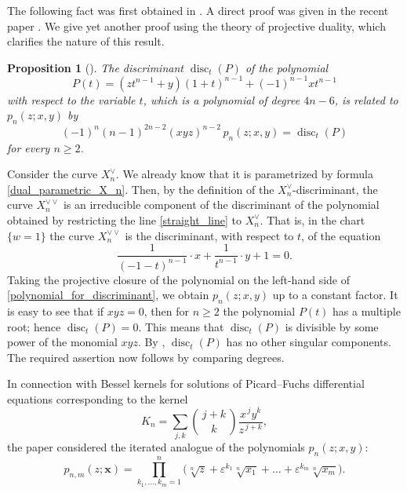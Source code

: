 \documentclass[14pt, dvipsnames]{extarticle}
\makeatletter
\theoremstyle{plain}
\newtheorem{prop}{Proposition}
\theoremstyle{definition}
\theoremstyle{remark}
\renewenvironment{proof}[1][\proofname]{
  \par\pushQED{\qed}\normalfont
  \topsep6\p@\@plus6\p@\relax
  \trivlist\item[\hskip\labelsep\bfseries\itshape #1\@addpunct{.}]
}{\popQED\endtrivlist\@endpefalse}
\DeclareMathOperator{\disc}{\mathrm{disc}}
\makeatother
\begin{document}

The following fact was first obtained in \cite[Theorem 2.3]{Gaiur}. A direct proof was given in the recent paper \cite{BK}. We give yet another proof using the theory of projective duality, which clarifies the nature of this result.

\begin{prop}[\cite{Gaiur}]
The discriminant $\disc_t(P)$ of the polynomial
$$P(t)=(z t^{n-1}+y)(1+t)^{n-1}+(-1)^{n-1}x t^{n-1}$$
with respect to the variable $t$, which is a polynomial of degree $4n-6$, is related to $p_n(z;x,y)$ by
$$(-1)^n (n-1)^{2n-2} (xyz)^{n-2}\, p_n(z;x,y)=\disc_t(P)$$
for every $n\ge 2$.
\end{prop}

\begin{proof}
Consider the curve $X_n^\vee$. We already know that it is parametrized by formula \eqref{dual_parametric_X_n}. Then, by the definition of the $X_n^\vee$-discriminant, the curve $X_n^{\vee\vee}$ is an irreducible component of the discriminant of the polynomial obtained by restricting the line \eqref{straight_line} to $X_n^\vee$. That is, in the chart $\{w=1\}$ the curve $X_n^{\vee\vee}$ is the discriminant, with respect to $t$, of the equation
\begin{equation}\label{polynomial_for_discriminant}
\frac{1}{(-1-t)^{n-1}}\cdot x+\frac{1}{t^{n-1}}\cdot y+1=0.
\end{equation}
Taking the projective closure of the polynomial on the left-hand side of \eqref{polynomial_for_discriminant}, we obtain $p_n(z;x,y)$ up to a constant factor. It is easy to see that if $xyz=0$, then for $n\ge 2$ the polynomial $P(t)$ has a multiple root; hence $\disc_t(P)=0$. This means that $\disc_t(P)$ is divisible by some power of the monomial $xyz$. By \cite[Theorem 2.2]{Gaiur}, $\disc_t(P)$ has no other singular components. The required assertion now follows by comparing degrees.
\end{proof}

In connection with Bessel kernels for solutions of Picard--Fuchs differential equations corresponding to the kernel
$$K_n=\sum_{j,k}\binom{\,j+k\,}{k}\frac{x^{\,j} y^k}{z^{\,j+k}},$$
the paper \cite{Gaiur} considered the iterated analogue of the polynomials $p_n(z;x,y)$:
\begin{equation}\label{p_nm_polynomial}
p_{n,m}(z;\bm{x})=\prod_{k_1,\dots,k_m=1}^{n}\bigl(\sqrt[n]{z}+\varepsilon^{k_1}\sqrt[n]{x_1}+\dots+\varepsilon^{k_m}\sqrt[n]{x_m}\bigr).
\end{equation}
\end{document}
